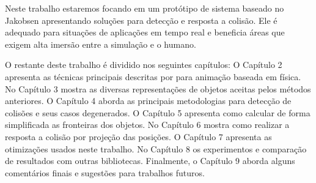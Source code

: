 Neste trabalho estaremos focando em um protótipo de sistema baseado no Jakobsen apresentando soluções para detecção e resposta a colisão. Ele é adequado para situações de aplicações em tempo real e beneficia áreas que exigem alta imersão entre a simulação e o humano.

O restante deste trabalho é dividido nos seguintes capítulos: O Capítulo 2 apresenta as técnicas principais descritas por \citeauthor{jakobsen2001advanced} para animação baseada em física. No Capítulo 3 mostra as diversas representações de objetos aceitas pelos métodos anteriores. O Capítulo 4 aborda as principais metodologias para detecção de colisões e seus casos degenerados. O Capítulo 5 apresenta como calcular de forma simplificada as fronteiras dos objetos. No Capítulo 6 mostra como realizar a resposta a colisão por projeção das posições. O Capítulo 7 apresenta as otimizações usados neste trabalho. No Capítulo 8 os experimentos e comparação de resultados com outras bibliotecas. Finalmente, o Capítulo 9 aborda alguns comentários finais e sugestões para trabalhos futuros.
